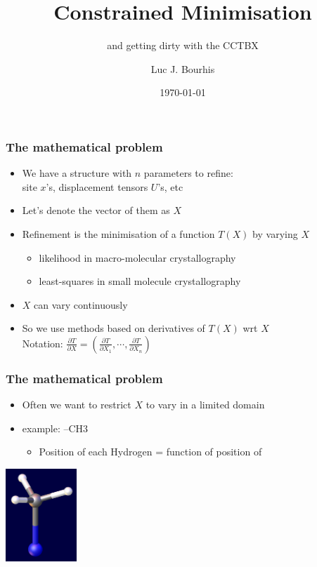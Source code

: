 \documentclass[10pt]{beamer}
\title{Constrained Minimisation}
\subtitle{and getting dirty with the CCTBX}
\date{\today}
\author{Luc J. Bourhis}
\institute{Durham University, UK and Bruker AXS}
\newcommand{\partialder}[2]{\frac{\partial #1}{\partial #2}}
\begin{document}
\maketitle


\begin{frame}[fragile]
\frametitle{The mathematical problem}
\begin{itemize}
\item We have a structure with $n$ parameters to refine:\\site $x$'s, displacement tensors $U$'s, etc
\item Let's denote the vector of them as $X$
\item Refinement is the minimisation of a function $T(X)$ by varying $X$
\begin{itemize}
\item likelihood in macro-molecular crystallography
\item least-squares in small molecule crystallography
\end{itemize}
\item $X$ can vary continuously
\item So we use methods based on derivatives of $T(X)$ wrt $X$\\ Notation: $\partialder{T}{X}=\left(\partialder{T}{X_1}, \cdots, \partialder{T}{X_n}\right)$
\end{itemize}
\end{frame}

\begin{frame}[fragile]
\frametitle{The mathematical problem}
\begin{itemize}
\item Often we want to restrict $X$ to vary in a limited domain
\item example: --CH3 
\begin{itemize}
\item Position of each Hydrogen = function of position of 
\end{itemize}
\end{itemize}
\begin{flushright}
\includegraphics[height=3.5cm]{ch3.png}
\end{flushright}

\end{frame}
\end{document}
